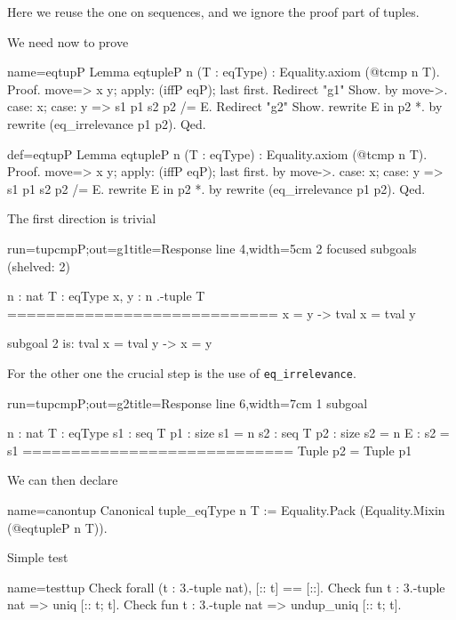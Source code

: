 Here we reuse the one on sequences, and we ignore the
proof part of tuples.

We need now to prove

\begin{coqdef}{name=eqtupP}
Lemma eqtupleP n (T : eqType) : Equality.axiom (@tcmp n T).
Proof.
move=> x y; apply: (iffP eqP); last first.
Redirect "g1" Show.
  by move->.
case: x; case: y => s1 p1 s2 p2 /= E. Redirect "g2" Show.
rewrite E in p2 *.
by rewrite (eq_irrelevance p1 p2).
Qed.
\end{coqdef}
\begin{coq}{def=eqtupP}{}
Lemma eqtupleP n (T : eqType) : Equality.axiom (@tcmp n T).
Proof.
move=> x y; apply: (iffP eqP); last first.
  by move->.
case: x; case: y => s1 p1 s2 p2 /= E.
rewrite E in p2 *.
by rewrite (eq_irrelevance p1 p2).
Qed.
\end{coq}

The first direction is trivial

\begin{coqout}{run=tupcmpP;out=g1}{title=Response line 4,width=5cm}
2 focused subgoals (shelved: 2)

n : nat
T : eqType
x, y : n .-tuple T
============================
x = y -> tval x = tval y

subgoal 2 is:
  tval x = tval y -> x = y
\end{coqout}

For the other one the crucial step is the use
of \lstinline/eq_irrelevance/.

\begin{coqout}{run=tupcmpP;out=g2}{title=Response line 6,width=7cm}
1 subgoal

n : nat
T : eqType
s1 : seq T
p1 : size s1 = n
s2 : seq T
p2 : size s2 = n
E : s2 = s1
============================
Tuple p2 = Tuple p1
\end{coqout}

We can then declare

\begin{coq}{name=canontup}{}
Canonical tuple_eqType n T :=
  Equality.Pack (Equality.Mixin (@eqtupleP n T)).
\end{coq}

Simple test

\begin{coq}{name=testtup}{}
Check forall (t : 3.-tuple nat), [:: t] == [::].
Check fun t : 3.-tuple nat => uniq [:: t; t].
Check fun t : 3.-tuple nat => undup_uniq [:: t; t].
\end{coq}

